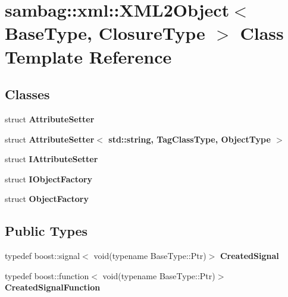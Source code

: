 \hypertarget{classsambag_1_1xml_1_1_x_m_l2_object}{
\section{sambag::xml::XML2Object$<$ BaseType, ClosureType $>$ Class Template Reference}
\label{classsambag_1_1xml_1_1_x_m_l2_object}
}
\subsection*{Classes}
\begin{DoxyCompactItemize}
\item 
struct {\bfseries AttributeSetter}
\item 
struct {\bfseries AttributeSetter$<$ std::string, TagClassType, ObjectType $>$}
\item 
struct {\bfseries IAttributeSetter}
\item 
struct {\bfseries IObjectFactory}
\item 
struct {\bfseries ObjectFactory}
\end{DoxyCompactItemize}
\subsection*{Public Types}
\begin{DoxyCompactItemize}
\item 
\hypertarget{classsambag_1_1xml_1_1_x_m_l2_object_afd3d1ae457610c657ca9916a117f05ce}{
typedef boost::signal$<$ void(typename BaseType::Ptr)$>$ {\bfseries CreatedSignal}}
\label{classsambag_1_1xml_1_1_x_m_l2_object_afd3d1ae457610c657ca9916a117f05ce}

\item 
\hypertarget{classsambag_1_1xml_1_1_x_m_l2_object_a04e83335cccac904ad150889d3b943df}{
typedef boost::function$<$ void(typename BaseType::Ptr)$>$ {\bfseries CreatedSignalFunction}}
\label{classsambag_1_1xml_1_1_x_m_l2_object_a04e83335cccac904ad150889d3b943df}

\end{DoxyCompactItemize}
